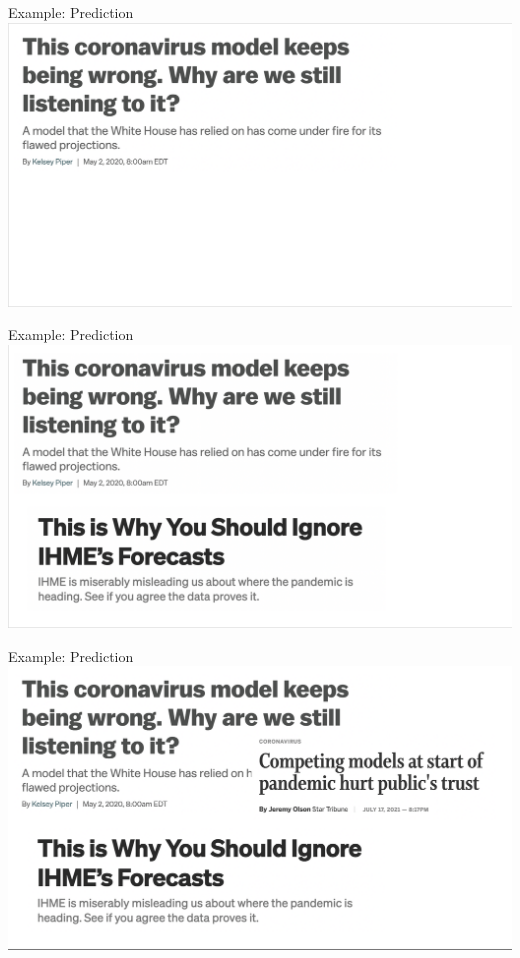 \documentclass[10pt,t]{beamer}
\begin{document}
\begin{frame}[c]{Example: Prediction}
\centering \includegraphics[scale=0.37]{ihme1.png}
\end{frame}

\begin{frame}[c]{Example: Prediction}
\centering \includegraphics[scale=0.37]{ihme2.png}
\end{frame}

\begin{frame}[c]{Example: Prediction}
\centering \includegraphics[scale=0.37]{ihme3.png}
\end{frame}
\end{document}
